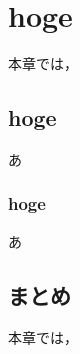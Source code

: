 \chapter{hoge}
    本章では，
    
\section{hoge}
    あ

    \subsection{hoge}
        あ

\section{まとめ}
    本章では，